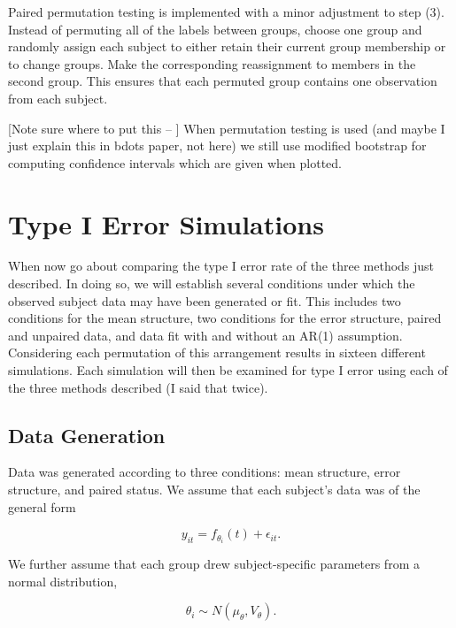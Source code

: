 \documentclass{article}
\begin{document}
Paired permutation testing is implemented with a minor adjustment to step (3). Instead of permuting all of the labels between groups, choose one group and randomly assign each subject to either retain their current group membership or to change groups. Make the corresponding reassignment to members in the second group. This ensures that each permuted group contains one observation from each subject.

[Note sure where to put this -- ] When permutation testing is used  (and maybe I just explain this in bdots paper, not here) we still use modified bootstrap for computing confidence intervals which are given when plotted.



\section{Type I Error Simulations}

When now go about comparing the type I error rate of the three methods just described. In doing so, we will establish several conditions under which the observed subject data may have been generated or fit. This includes two conditions for the mean structure, two conditions for the error structure, paired and unpaired data, and data fit with and without an AR(1) assumption. Considering each permutation of this arrangement results in sixteen different simulations. Each simulation will then be examined for type I error using each of the three methods described (I said that twice). 



\subsection{Data Generation}

Data was generated according to three conditions: mean structure, error structure, and paired status. We assume that each subject's data was of the general form 

\begin{equation}\label{eq:sm_f_general}
y_{it} = f_{\theta_i}(t) + \epsilon_{it}.
\end{equation}

We further assume that each group drew subject-specific parameters from a normal distribution, 

\begin{equation}\label{eq:tie_dist}
\theta_i \sim N(\mu_{\theta}, V_{\theta}).
\end{equation}
\end{document}
